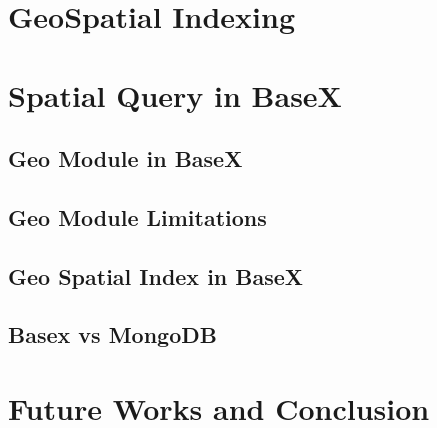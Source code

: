 \documentclass[a4paper,12pt]{article}
\begin{document}
\section{GeoSpatial Indexing}

\newpage

\section{Spatial Query in BaseX}
\subsection{Geo Module in BaseX}

\subsection{Geo Module Limitations}

\subsection{Geo Spatial Index in BaseX}

\subsection{Basex vs MongoDB}

\newpage
\section{Future Works and Conclusion}
\newpage


\end{document}
